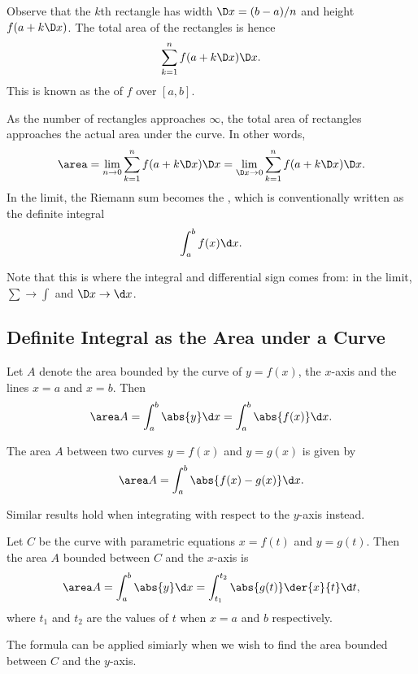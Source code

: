 Observe that the $k$th rectangle has width $\D x = (b-a)/n$ and height $f(a + k \D x)$. The total area of the rectangles is hence \[\sum_{k = 1}^n f(a + k \D x) \D x.\] This is known as the  of $f$ over $[a, b]$.

As the number of rectangles approaches $\infty$, the total area of rectangles approaches the actual area under the curve. In other words, \[\area = \lim_{n \to 0} \sum_{k = 1}^n f(a + k \D x) \D x = \lim_{\D x \to 0} \sum_{k = 1}^n f(a + k \D x) \D x.\] In the limit, the Riemann sum becomes the , which is conventionally written as the definite integral \[\int_a^b f(x) \d x.\]

Note that this is where the integral and differential sign comes from: in the limit, $\sum \to \int$ and $\D x \to \d x$.

\subsection{Definite Integral as the Area under a Curve}

\begin{proposition}
    Let $A$ denote the area bounded by the curve of $y = f(x)$, the $x$-axis and the lines $x = a$ and $x = b$. Then \[\area A = \int_a^b \abs{y} \d x = \int_a^b \abs{f(x)} \d x.\]
\end{proposition}

\begin{proposition}
    The area $A$ between two curves $y = f(x)$ and $y = g(x)$ is given by \[\area A = \int_a^b \abs{f(x) - g(x)} \d x.\]
\end{proposition}

Similar results hold when integrating with respect to the $y$-axis instead.

\begin{proposition}
    Let $C$ be the curve with parametric equations $x = f(t)$ and $y = g(t)$. Then the area $A$ bounded between $C$ and the $x$-axis is \[\area A = \int_a^b \abs{y} \d x = \int_{t_1}^{t_2} \abs{g(t)} \der{x}{t} \d t,\] where $t_1$ and $t_2$ are the values of $t$ when $x = a$ and $b$ respectively.
\end{proposition}

The formula can be applied simiarly when we wish to find the area bounded between $C$ and the $y$-axis.

